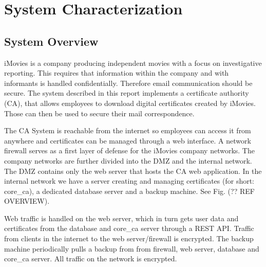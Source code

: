 \documentclass[english]{article}
\begin{document}
\section{System Characterization}

\subsection{System Overview}



iMovies is a company producing independent movies with a focus on investigative reporting. This requires that information within the company and with informants is handled confidentially. Therefore email communication should be secure.
The system described in this report implements a certificate authority (CA), that allows employees to download digital certificates created by iMovies. Those can then be used to secure their mail correspondence.

The CA System is reachable from the internet so employees can access it from anywhere and certificates can be managed through a web interface. A network firewall serves as a first layer of defense for the iMovies company networks.
The company networks are further divided into the DMZ and the internal network. The DMZ contains only the web server that hosts the CA web application. In the internal network we have a server creating and managing certificates
(for short: core\_ca), a dedicated database server and a backup machine. See Fig. (?? REF OVERVIEW).

Web traffic is handled on the web server, which in turn gets user data and certificates from the database and core\_ca server through a REST API. Traffic from clients in the internet to the web server/firewall is encrypted.
The backup machine periodically pulls a backup from from firewall, web server, database and core\_ca server. All traffic on the network is encrypted.
\end{document}
